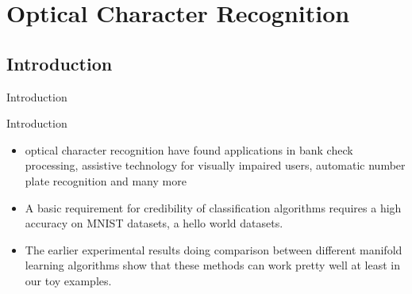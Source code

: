 \documentclass{beamer}
\theoremstyle{plain}
\theoremstyle{definition}
\theoremstyle{plain}
\theoremstyle{plain}
\begin{document}
\section{Optical Character Recognition}
\subsection{Introduction}{Introduction}
\begin{frame}{Introduction}
\begin{itemize}
\item optical character recognition have found applications in bank check processing, assistive technology for visually impaired users, automatic number plate recognition and many more
\item A basic requirement for credibility of classification algorithms  requires a high accuracy on MNIST datasets, a hello world datasets.
\item The earlier experimental results doing comparison between different manifold learning algorithms show that these methods can work pretty well at least in our toy examples.
\end{itemize}
\end{frame}

\end{document}
